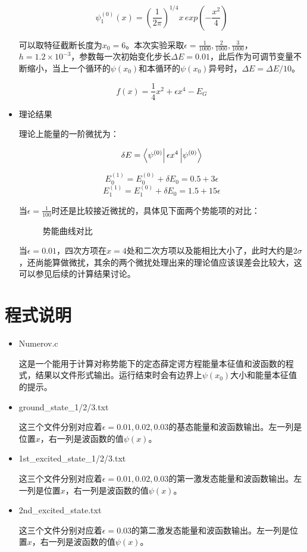 \documentclass[UTF8]{ctexart}
\begin{document}
\begin{itemize}
		$$\psi_1^{(0)}(x)=\left( \frac{1}{2\pi}\right) ^{1/4}x \,exp(-\frac{x^2}{4})$$
		
		可以取特征截断长度为$x_0=6$。本次实验采取$\epsilon=\frac{1}{1000},\frac{2}{1000},\frac{3}{1000}$，$h=1.2\times10^{-3}$，参数每一次初始变化步长$\Delta E=0.01$，此后作为可调节变量不断缩小，当上一个循环的$\psi(x_0)$和本循环的$\psi(x_0)$异号时，$\Delta E=\Delta E/10$。
		
		$$f(x)=\frac{1}{4}x^2+\epsilon x^4-E_G$$
		
		\item 理论结果
		
		理论上能量的一阶微扰为：
		
		$$\delta E=\bra{\psi^{(0)}}\epsilon x^4\ket{\psi^{(0)}}$$
		
		$$E_0^{(1)}=E_0^{(0)}+\delta E_0=0.5+3\epsilon$$
		$$E_1^{(1)}=E_1^{(0)}+\delta E_0=1.5+15\epsilon$$
		
		当$\epsilon=\frac{1}{100}$时还是比较接近微扰的，具体见下面两个势能项的对比：
		
			\begin{figure}[H]
					\centering  %
					\caption{势能曲线对比}
			\end{figure}
			
	当$\epsilon=0.01$，四次方项在$x=4$处和二次方项以及能相比大小了，此时大约是$2\sigma$，还尚能算做微扰，其余的两个微扰处理出来的理论值应该误差会比较大，这可以参见后续的计算结果讨论。
	
		
	\end{itemize}
	
	\section{程式说明}
	
	\begin{itemize}
		\item Numerov.c
		
		这是一个能用于计算对称势能下的定态薛定谔方程能量本征值和波函数的程式，结果以文件形式输出。运行结束时会有边界上$\psi(x_0)$大小和能量本征值的提示。
		
		\item ground\_state\_1/2/3.txt
		
		这三个文件分别对应着$\epsilon=0.01,0.02,0.03$的基态能量和波函数输出。左一列是位置$x$，右一列是波函数的值$\psi(x)$。
		
		\item 1st\_excited\_state\_1/2/3.txt
		
		这三个文件分别对应着$\epsilon=0.01,0.02,0.03$的第一激发态能量和波函数输出。左一列是位置$x$，右一列是波函数的值$\psi(x)$。
		
		\item 2nd\_excited\_state.txt
		
		这三个文件分别对应着$\epsilon=0.03$的第二激发态能量和波函数输出。左一列是位置$x$，右一列是波函数的值$\psi(x)$。
		
		
		
	\end{itemize}
	
\end{document}

